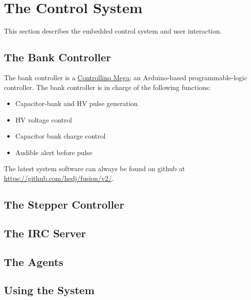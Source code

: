 
\section{The Control System}

This section describes the embedded control system and user interaction.

\subsection{The Bank Controller}

The bank controller is a \href{http://controllino.biz/product/controllino-mega/}{Controllino Mega}; an
Arduino-based programmable-logic controller. The bank controller is in charge of the following functions:
\begin{itemize}
  \item{Capacitor-bank and HV pulse generation}
  \item{HV voltage control}
  \item{Capacitor bank charge control}
  \item{Audible alert before pulse}
\end{itemize}

The latest system software can always be found on github at \url{https://github.com/hedj/fusion/v2/}.

\subsection{The Stepper Controller}
\subsection{The IRC Server}
\subsection{The Agents}
\subsection{Using the System}
